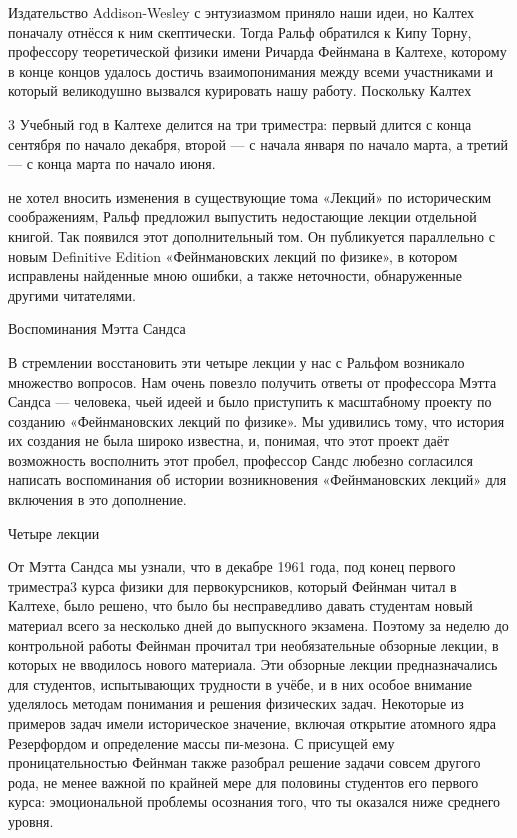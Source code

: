 \documentclass[10pt,oneside]{article}
\newcommand{\TipsRunning}[1]{\par\vspace{2bp}{\centering\footnotesize #1\par}\vspace{2bp}}
\begin{document}
Издательство Addison-Wesley с энтузиазмом приняло наши идеи, но Калтех поначалу отнёсся к ним скептически. Тогда Ральф обратился к Кипу Торну, профессору теоретической физики имени Ричарда Фейнмана в Калтехе, которому в конце концов удалось достичь взаимопонимания между всеми участниками и который великодушно вызвался курировать нашу работу. Поскольку Калтех\par

\TipsRunning{В В Е Д Е Н И Е \textbackslash{}textbullet\{\} x i i i}

3 Учебный год в Калтехе делится на три триместра: первый длится с конца сентября по начало декабря, второй --- с начала января по начало марта, а третий --- с конца марта по начало июня.\par

не хотел вносить изменения в существующие тома «Лекций» по историческим соображениям, Ральф предложил выпустить недостающие лекции отдельной книгой. Так появился этот дополнительный том. Он публикуется параллельно с новым Definitive Edition «Фейнмановских лекций по физике», в котором исправлены найденные мною ошибки, а также неточности, обнаруженные другими читателями.\par

Воспоминания Мэтта Сандса\par

В стремлении восстановить эти четыре лекции у нас с Ральфом возникало множество вопросов. Нам очень повезло получить ответы от профессора Мэтта Сандса --- человека, чьей идеей и было приступить к масштабному проекту по созданию «Фейнмановских лекций по физике». Мы удивились тому, что история их создания не была широко известна, и, понимая, что этот проект даёт возможность восполнить этот пробел, профессор Сандс любезно согласился написать воспоминания об истории возникновения «Фейнмановских лекций» для включения в это дополнение.\par

Четыре лекции\par

От Мэтта Сандса мы узнали, что в декабре 1961 года, под конец первого триместра3 курса физики для первокурсников, который Фейнман читал в Калтехе, было решено, что было бы несправедливо давать студентам новый материал всего за несколько дней до выпускного экзамена. Поэтому за неделю до контрольной работы Фейнман прочитал три необязательные обзорные лекции, в которых не вводилось нового материала. Эти обзорные лекции предназначались для студентов, испытывающих трудности в учёбе, и в них особое внимание уделялось методам понимания и решения физических задач. Некоторые из примеров задач имели историческое значение, включая открытие атомного ядра Резерфордом и определение массы пи-мезона. С присущей ему проницательностью Фейнман также разобрал решение задачи совсем другого рода, не менее важной по крайней мере для половины студентов его первого курса: эмоциональной проблемы осознания того, что ты оказался ниже среднего уровня.\par
\end{document}
